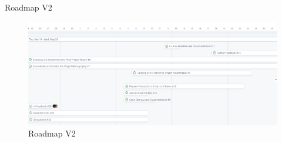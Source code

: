 \documentclass[10pt]{beamer}
\begin{document}
\begin{frame}{Roadmap V2}
  \begin{figure}[h] %
    \centering
    \includegraphics[width=1\textwidth]{images/roadmap_v2.png}
    \caption{Roadmap V2} %
    \label{} %
    \end{figure}
\end{frame}


 
\nocite{*}


\end{document}
